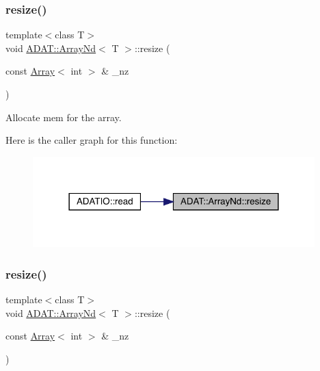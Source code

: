 \subsubsection{\texorpdfstring{resize()}{resize()}\hspace{0.1cm}{\footnotesize\ttfamily [1/10]}}
{\footnotesize\ttfamily template$<$class T$>$ \\
void \mbox{\hyperlink{classADAT_1_1ArrayNd}{A\+D\+A\+T\+::\+Array\+Nd}}$<$ T $>$\+::resize (\begin{DoxyParamCaption}\item[{const \mbox{\hyperlink{classXMLArray_1_1Array}{Array}}$<$ int $>$ \&}]{\+\_\+nz }\end{DoxyParamCaption})\hspace{0.3cm}{\ttfamily [inline]}}



Allocate mem for the array. 

Here is the caller graph for this function\+:\nopagebreak
\begin{figure}[H]
\begin{center}
\leavevmode
\includegraphics[width=309pt]{d1/db2/classADAT_1_1ArrayNd_afcf13cf80c4cb861316d1ad55601818e_icgraph}
\end{center}
\end{figure}
\mbox{\label{classADAT_1_1ArrayNd_afcf13cf80c4cb861316d1ad55601818e}} 
\subsubsection{\texorpdfstring{resize()}{resize()}\hspace{0.1cm}{\footnotesize\ttfamily [2/10]}}
{\footnotesize\ttfamily template$<$class T$>$ \\
void \mbox{\hyperlink{classADAT_1_1ArrayNd}{A\+D\+A\+T\+::\+Array\+Nd}}$<$ T $>$\+::resize (\begin{DoxyParamCaption}\item[{const \mbox{\hyperlink{classXMLArray_1_1Array}{Array}}$<$ int $>$ \&}]{\+\_\+nz }\end{DoxyParamCaption})\hspace{0.3cm}{\ttfamily [inline]}}



